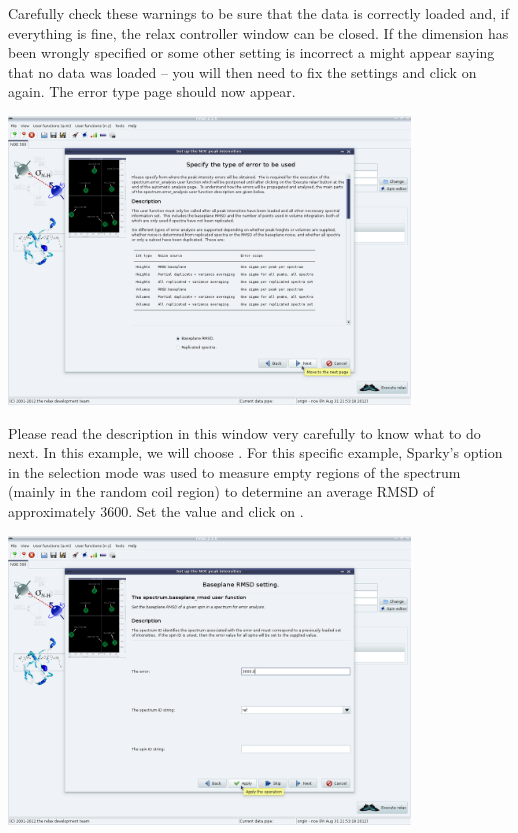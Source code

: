 Carefully check these warnings to be sure that the data is correctly loaded and, if everything is fine, the relax controller window can be closed.
If the dimension has been wrongly specified or some other setting is incorrect a  might appear saying that no data was loaded -- you will then need to fix the settings and click on  again.
The error type page should now appear.

\begin{minipage}[h]{\linewidth}
\centerline{\includegraphics[width=0.8\textwidth, bb=14 14 1415 1019]{graphics/screenshots/noe_analysis/peak_intensity4}}
\end{minipage}

Please read the description in this window very carefully to know what to do next.
In this example, we will choose .
For this specific example, Sparky's  option in the  selection mode was used to measure empty regions of the spectrum (mainly in the random coil region) to determine an average RMSD of approximately 3600.
Set the value and click on .

\begin{minipage}[h]{\linewidth}
\centerline{\includegraphics[width=0.8\textwidth, bb=14 14 1415 1019]{graphics/screenshots/noe_analysis/peak_intensity5}}
\end{minipage}

